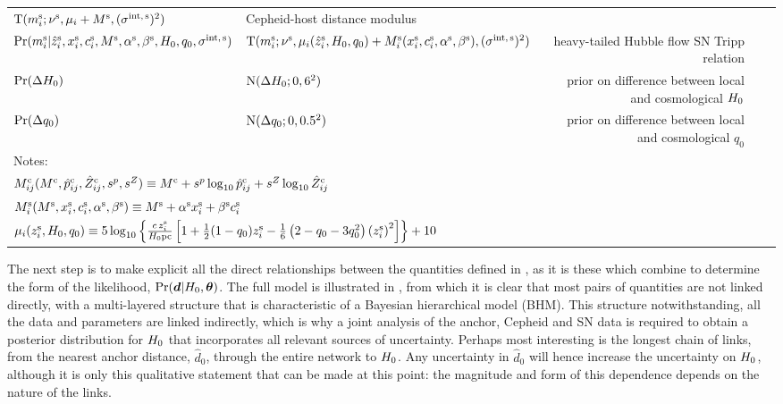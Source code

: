 \documentclass[a4paper,fleqn,usenatbib]{mnras}
\newcommand{\slopep}{\ensuremath{s^p}}
\newcommand{\slopeZ}{\ensuremath{s^Z}}
\newcommand{\Mstdc}{\ensuremath{M^{\rm c}}}
\newcommand{\phatc}{\ensuremath{\hat{p}_{ij}^{\rm c}}}
\newcommand{\Zhatc}{\ensuremath{\hat{Z}_{ij}^{\rm c}}}
\newcommand{\Mstds}{\ensuremath{M^{\rm s}}}
\newcommand{\sigints}{\ensuremath{\sigma^{\rm int,\,s}}}
\newcommand{\xsalt}{\ensuremath{x^{\rm s}}}
\newcommand{\csalt}{\ensuremath{c^{\rm s}}}
\newcommand{\alphas}{\ensuremath{\alpha^{\rm s}}}
\newcommand{\betas}{\ensuremath{\beta^{\rm s}}}
\newcommand{\msup}{\ensuremath{m_i^{\rm s}}}
\newcommand{\decel}{\ensuremath{q_0}}
\newcommand{\zs}{\ensuremath{z_i^{\rm s}}}
\newcommand{\zhats}{\ensuremath{\hat{z}_i^{\rm s}}}
\newcommand{\dofs}{\ensuremath{\nu^{\rm s}}}
\newcommand{\dhubble}{\ensuremath{\Delta H_0}}
\newcommand{\ddecel}{\ensuremath{\Delta q_0}}
\begin{document}
{\begin{table*}
\begin{tabular}{llrll}
  ${\rm T}(\msup;\dofs,\mu_i + \Mstds,(\sigints)^2)$ &
    Cepheid-host distance modulus \\
$\prob(\msup|\zhats,\xsalt_i,\csalt_i,\Mstds,\alphas,\betas,\hubble,\decel,\sigints)$ &
  ${\rm T}(\msup; \dofs, \mu_i(\zhats,\hubble,\decel) + M_i^{\rm s}(\xsalt_i,\csalt_i,\alphas,\betas), (\sigints)^2)$ &
    heavy-tailed Hubble flow SN Tripp relation \\
\hline
$\prob(\dhubble)$ &
  $\normal(\dhubble;0, 6^2)$ &
    prior on difference between local and cosmological $H_0$\\
$\prob(\ddecel)$ &
  $\normal(\ddecel;0, 0.5^2)$ &
    prior on difference between local and cosmological $\decel$ \\
\hline
\multicolumn{3}{p{\columnwidth}}{Notes:} \\
\multicolumn{3}{p{\columnwidth}}{$M^{\rm c}_{ij}(\Mstdc,\phatc,\Zhatc,\slopep,\slopeZ) \equiv \Mstdc + \slopep \log_{10} \phatc  + \slopeZ \log_{10} \Zhatc$} \\
\multicolumn{3}{p{\columnwidth}}{$M_i^{\rm s}(\Mstds,\xsalt_i,\csalt_i,\alphas,\betas) \equiv \Mstds + \alphas \xsalt_i + \betas \csalt_i$} \\
\multicolumn{3}{p{\columnwidth}}{$\mu_i(\zs,\hubble,\decel) \equiv 5 \log_{10} \left\{ \frac{c\,\zs}{\hubble {\rm pc}} \left[ 1 + \frac{1}{2}(1 - \decel) \zs - \frac{1}{6}\left(2 - \decel - 3\decel ^ 2\right) \left(\zs \right)^2 \right] \right\} + 10$}
\end{tabular}
\end{table*}

The next step is to make explicit all the direct relationships between the quantities defined in , as it is these which combine to determine the form of the likelihood, ${\rm{Pr}}(\mbox{\boldmath ${d}$} | H_0, \mbox{\boldmath ${\theta}$})$. 
The full model is illustrated in , 
from which it is clear that most pairs of quantities are 
not linked directly, with a multi-layered structure that is characteristic of a Bayesian hierarchical model (BHM).
This structure notwithstanding, all the data and parameters 
are linked indirectly, which is why a joint analysis 
of the anchor, Cepheid and SN data is required to 
obtain a posterior distribution for $H_0$ that incorporates all relevant sources of uncertainty.
Perhaps most interesting is the longest chain of links,
from the nearest anchor distance, $\hat{d}_0$, 
through the entire network to $H_0$.
Any uncertainty in $\hat{d}_0$
will hence increase the uncertainty on $H_0$, although 
it is only this qualitative statement that can be made at this point:
the magnitude and form of this dependence depends on the nature of the links.

}
\end{document}
